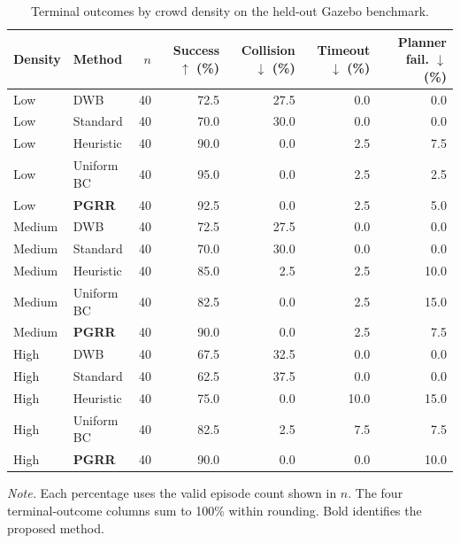 \begin{table}[t]
\caption{Terminal outcomes by crowd density on the held-out Gazebo benchmark.}
\label{tab:moderate-density-results}
\centering
\footnotesize
\setlength{\tabcolsep}{4.2pt}
\renewcommand{\arraystretch}{1.06}
\begin{tabular}{@{}llrrrrr@{}}
\toprule
Density & Method & $n$ & Success $\uparrow$ (\%) & Collision $\downarrow$ (\%)
& Timeout $\downarrow$ (\%) & Planner fail. $\downarrow$ (\%) \\
\midrule
Low & DWB & 40 & 72.5 & 27.5 & 0.0 & 0.0 \\
Low & Standard & 40 & 70.0 & 30.0 & 0.0 & 0.0 \\
Low & Heuristic & 40 & 90.0 & 0.0 & 2.5 & 7.5 \\
Low & Uniform BC & 40 & 95.0 & 0.0 & 2.5 & 2.5 \\
Low & \textbf{PGRR} & 40 & 92.5 & 0.0 & 2.5 & 5.0 \\
\addlinespace[2pt]
Medium & DWB & 40 & 72.5 & 27.5 & 0.0 & 0.0 \\
Medium & Standard & 40 & 70.0 & 30.0 & 0.0 & 0.0 \\
Medium & Heuristic & 40 & 85.0 & 2.5 & 2.5 & 10.0 \\
Medium & Uniform BC & 40 & 82.5 & 0.0 & 2.5 & 15.0 \\
Medium & \textbf{PGRR} & 40 & 90.0 & 0.0 & 2.5 & 7.5 \\
\addlinespace[2pt]
High & DWB & 40 & 67.5 & 32.5 & 0.0 & 0.0 \\
High & Standard & 40 & 62.5 & 37.5 & 0.0 & 0.0 \\
High & Heuristic & 40 & 75.0 & 0.0 & 10.0 & 15.0 \\
High & Uniform BC & 40 & 82.5 & 2.5 & 7.5 & 7.5 \\
High & \textbf{PGRR} & 40 & 90.0 & 0.0 & 0.0 & 10.0 \\
\bottomrule
\end{tabular}
\vspace{2pt}

\parbox{0.98\textwidth}{\footnotesize \emph{Note.} Each percentage uses the valid
episode count shown in $n$. The four terminal-outcome columns sum to 100\% within rounding.
Bold identifies the proposed method.}
\end{table}

